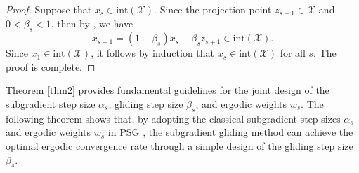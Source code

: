 \documentclass[sn-mathphys]{JORSC-jnl}%
\theoremstyle{thmstyleone}%
\theoremstyle{thmstylethree}%
\begin{document}
\begin{proof}
	Suppose that $x_s \in \text{int}(\mathcal{X})$. Since the projection point $z_{s+1}\in\mathcal{X}$ and $0 < \beta_s <1$, then by \cite[Theorem 6.1]{Rockafellar}, we have 
	\begin{equation*}
		x_{s+1} = (1-\beta_s)x_s + \beta_s z_{s+1} \in \text{int}(\mathcal{X}).
	\end{equation*}
	Since $x_1 \in \text{int}(\mathcal{X})$, it follows by induction that $x_s \in \text{int}(\mathcal{X})$ for all $s$. The proof is complete.
\end{proof}

Theorem \ref{thm2} provides fundamental guidelines for the joint design of the subgradient step size $\alpha_s$, gliding step size $\beta_s$, and ergodic weights $w_s$. The following theorem shows that, by adopting the classical subgradient step sizes $\alpha_s$ and ergodic weights $w_s$ in PSG \cite{bubeck2015convex,beck2017first,nesterov2018lectures,Zhu, Xia}, the subgradient gliding method can achieve the optimal ergodic convergence rate through a simple design of the gliding step size $\beta_s$.
\end{document}
